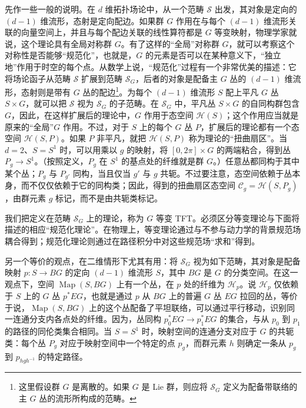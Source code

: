 先作一些一般的说明。在 $d$ 维拓扑场论中，从一个范畴 $\mathcal{S}$ 出发，其对象是定向的 $(d-1)$ 维流形，态射是定向配边。如果群 $G$ 作用在与每个 $(d-1)$ 维流形关联的向量空间上，并且与每个配边关联的线性算符都是 $G$ 等变映射，物理学家就说，这个理论具有全局对称群 $G$。有了这样的“全局”对称群 $G$，就可以考察这个对称性是否能够“规范化”，也就是，$G$ 的元素是否可以在某种意义下，“独立地”作用于时空的每个点。从数学上说，“规范化”过程有一个非常优美的描述：它将场论函子从范畴 $\mathcal{S}$ 扩展到范畴 $\mathcal{S}_G$，后者的对象是配备主 $G$ 丛的 $(d-1)$ 维流形，态射则是带有 $G$ 丛的配边\footnote{这里假设群 $G$ 是离散的。如果 $G$ 是 Lie 群，则应将 $\mathcal{S}_G$ 定义为配备带联络的主 $G$ 丛的流形所构成的范畴。}。为每个 $(d-1)$ 维流形 $S$ 配上平凡 $G$ 丛 $S\times G$，就可以把 $\mathcal{S}$ 视为 $\mathcal{S}_G$ 的子范畴。在 $\mathcal{S}_G$ 中，平凡丛 $S\times G$ 的自同构群包含 $G$，因此，在这样扩展后的理论中，$G$ 作用于态空间 $\mathcal{H}(S)$；这个作用应当就是原来的“全局”$G$ 作用。不过，对于 $S$ 上的每个 $G$ 丛 $P$，扩展后的理论都有一个态空间 $\mathcal{H}(S,P)$。如果 $P$ 非平凡，就把 $\mathcal{H}(S,P)$ 称为理论的“扭曲扇区”。当 $d=2$、$S=S^1$ 时，可以用乘以 $g$ 的映射，将 $[0,2\pi]\times G$ 的两端粘合，得到丛 $P_g\to S^1$。（按照定义，$P_g$ 在 $S^1$ 的基点处的纤维就是群 $G$。）任意丛都同构于其中某个丛；$P_g$ 与 $P_{g'}$ 同构，当且仅当 $g'$ 与 $g$ 共轭。不过要注意，态空间依赖于丛本身，而不仅仅依赖于它的同构类；因此，得到的扭曲扇区态空间 $\mathcal{C}_g=\mathcal{H}(S,P_g)$，由群元素 $g$ 标记，而不是由共轭类标记。

我们把定义在范畴 $\mathcal{S}_G$ 上的理论，称为 $G$ 等变 TFT。必须区分等变理论与下面将描述的相应“规范化理论”。在物理上，等变理论通过与不参与动力学的背景规范场耦合得到；规范化理论则通过在路径积分中对这些规范场“求和”得到。

另一个等价的观点，在二维情形下尤其有用：将 $\mathcal{S}_G$ 视为如下范畴，其对象是配备映射 $p\colon S\to BG$ 的定向 $(d-1)$ 维流形 $S$，其中 $BG$ 是 $G$ 的分类空间。在这一观点下，空间 $\operatorname{Map}(S,BG)$ 上有一个丛，在 $p$ 处的纤维为 $\mathcal{H}_p$。说 $\mathcal{H}_p$ 仅依赖于 $S$ 上的 $G$ 丛 $p^*EG$，也就是通过 $p$ 从 $BG$ 上的普遍 $G$ 丛 $EG$ 拉回的丛，等价于说，$\operatorname{Map}(S,BG)$ 上的这个丛配备了平坦联络，可以通过平行移动，识别同一连通分支内各点处的纤维。因为，丛同构 $p_0^*EG\to p_1^*EG$ 的集合，与从 $p_0$ 到 $p_1$ 的路径的同伦类集合相同。当 $S=S^1$ 时，映射空间的连通分支对应于 $G$ 的共轭类：每个丛 $P_g$ 对应于映射空间中一个特定的点 $p_g$，而群元素 $h$ 则确定一条从 $p_g$ 到 $p_{hgh^{-1}}$ 的特定路径。

